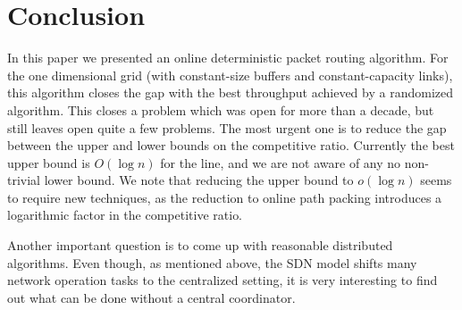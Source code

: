 \documentclass[11pt]{article}
\newtheorem{theorem}{Theorem}
\newenvironment{proof sketch}[1]{\noindent {\emph{Proof sketch of #1:}}}{\hfill \qed}
\begin{document}
\begin{comment}
We conclude with the following theorem.
\begin{theorem}
  If $B\in [1,\log n]$ and $c \in [\log n, \infty)$, then there exists a randomized
  online algorithm that achieves a logarithmic competitive ratio for packet routing
  in a uni-directional line.
\end{theorem}


\paragraph{Remark.}
The space-time graph seems to assign symmetric roles to the time axis and the space
axis.  Such a symmetry would imply that one could reduce the case of large buffers to
the case of large link capacities. However, this is not true due to the definition of
a destination.  A destination (in the space-time graph) is a row of
vertices (namely, the set of copies of an original vertex).
This implies that one cannot simply transpose the graph and exchange the roles of
space and time.
\end{comment}

\section{Conclusion}
\label{sec:conc}
In this paper we presented an online deterministic packet routing algorithm.  For the
one dimensional grid (with constant-size buffers and constant-capacity links), this
algorithm closes the gap with the best throughput achieved by a randomized
algorithm.  This closes a problem which was open for more than a decade, but still
leaves open quite a few problems. The most urgent one is to reduce the gap between
the upper and lower bounds on the competitive ratio. Currently the best upper bound
is $O(\log n)$ for the line, and we are not aware of any no non-trivial lower bound.
We note that reducing the upper bound to $o(\log n)$ seems to require new techniques,
as the reduction to online path packing introduces a logarithmic factor in the
competitive ratio.

Another important question is to come up with reasonable distributed
algorithms. Even though, as mentioned above, the SDN model shifts many
network operation tasks to the centralized setting, it is very
interesting to find out what can be done without a central
coordinator.
\end{document}

